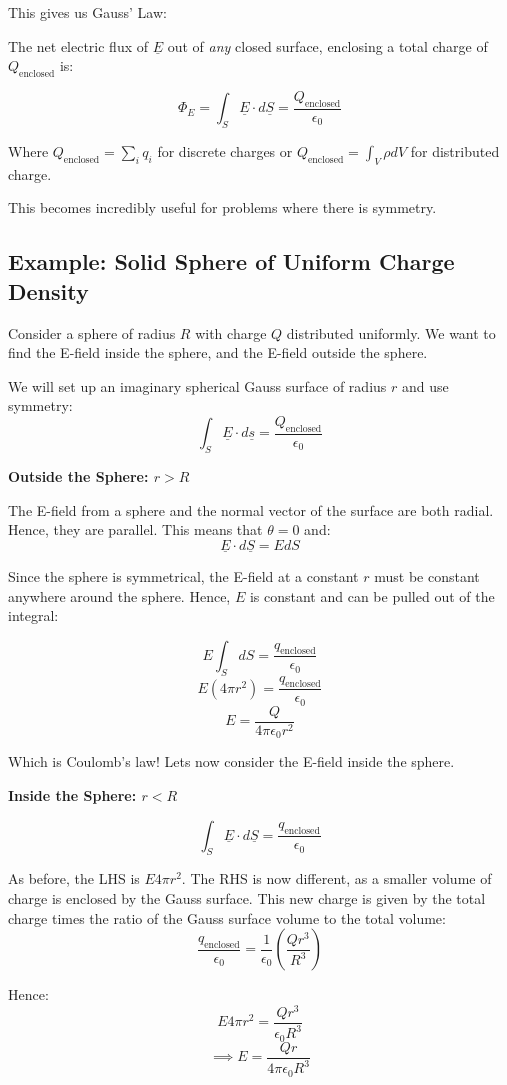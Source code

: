 This gives us Gauss' Law:

\begin{tcolorbox}
    The net electric flux of $\underline{E}$ out of \emph{any} closed surface, enclosing a total charge of $Q_\text{enclosed}$ is:

    \[
        \Phi_E = \int_S \underline{E} \cdot d \underline{S} = \frac{Q_\text{enclosed}}{\epsilon_0}
    \]
    
    Where $Q_\text{enclosed} = \sum_{i} q_i$ for discrete charges or $Q_\text{enclosed} = \int_V \rho dV$ for distributed charge.
\end{tcolorbox}

This becomes incredibly useful for problems where there is symmetry.

\subsection{Example: Solid Sphere of Uniform Charge Density}
Consider a sphere of radius $R$ with charge $Q$ distributed uniformly. We want to find the E-field inside the sphere, and the E-field outside the sphere.

We will set up an imaginary spherical Gauss surface of radius $r$ and use symmetry:
\[
    \int_S \underline{E} \cdot d \underline{s} = \frac{Q_\text{enclosed}}{\epsilon_0}
\]

\textbf{Outside the Sphere: $r > R$}

The E-field from a sphere and the normal vector of the surface are both radial. Hence, they are parallel. This means that $\theta = 0$ and:
\[
    \underline{E} \cdot d \underline{S} = E dS
\]

Since the sphere is symmetrical, the E-field at a constant $r$ must be constant anywhere around the sphere. Hence, $E$ is constant and can be pulled out of the integral:

\[
    E \int_S dS = \frac{q_\text{enclosed}}{\epsilon_0}
\]
\[
    E \left(4 \pi r^2\right) = \frac{q_\text{enclosed}}{\epsilon_0}
\]
\[
    E = \frac{Q}{4 \pi \epsilon_0 r^2}
\]

Which is Coulomb's law! Lets now consider the E-field inside the sphere.

\textbf{Inside the Sphere: $r < R$}

\[
    \int_S \underline{E} \cdot d \underline{S} = \frac{q_\text{enclosed}}{\epsilon_0}
\]

As before, the LHS is $E 4 \pi r^2$. The RHS is now different, as a smaller volume of charge is enclosed by the Gauss surface. This new charge is given by the total charge times the ratio of the Gauss surface volume to the total volume:
\[
    \frac{q_\text{enclosed}}{\epsilon_0} = \frac{1}{\epsilon_0} \left(\frac{Q r^3}{R^3}\right)
\]

Hence:
\[
    E 4 \pi r^2 = \frac{Qr^3}{\epsilon_0 R^3}
\]
\[
    \implies E = \frac{Q r}{4 \pi \epsilon_0 R^3}
\]
